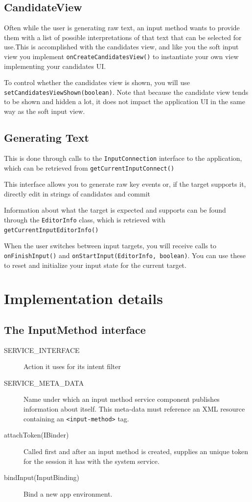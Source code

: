 \documentclass[11pt, a4paper]{book}
\begin{document}
\subsection{CandidateView}
Often while the user is generating raw text, an input method wants to provide
them with a list of possible interpretations of that text that can be selected
for use.This is accomplished with the candidates view, and like you the soft
input view you implement \verb|onCreateCandidatesView()| to instantiate your own
view implementing your candidates UI.

To control whether the candidates view is shown, you will use
\verb|setCandidatesViewShown(boolean)|. Note that because the candidate view
tends to be shown and hidden a lot, it does not impact the application UI in the
same way as the soft input view.

\subsection{Generating Text}
This is done through calls to the \verb|InputConnection| interface to the
application, which can be retrieved from \verb|getCurrentInputConnect()|

This interface allows you to generate raw key events or, if the target supports
it, directly edit in strings of candidates and commit

Information about what the target is expected and supports can be found through
the \verb|EditorInfo| class, which is retrieved with
\verb|getCurrentInputEditorInfo()|

When the user switches between input targets, you will receive calls to
\verb|onFinishInput()| and \verb|onStartInput(EditorInfo, boolean)|. You can use
these to reset and initialize your input state for the current target.

\section{Implementation details}
\subsection{The InputMethod interface}
\begin{description}
    \item[SERVICE\_INTERFACE] Action it uses for its intent filter
    \item[SERVICE\_META\_DATA] Name under which an input method service
        component publishes information about itself. This meta-data must
        reference an XML resource containing an \verb|<input-method>| tag.
    \item[attachToken(IBinder)]Called first and after an input method is
        created, supplies an unique token for the session it has with the system
        service.
    \item[bindInput(InputBinding)] Bind a new app environment.
\end{description}
\end{document}
